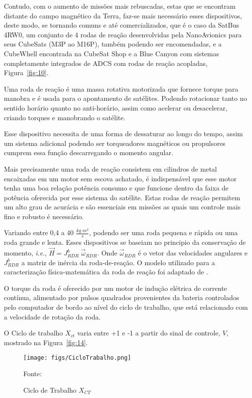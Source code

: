 Contudo, com o aumento de missões mais rebuscadas, estas que se encontram distante do campo magnético da Terra, faz-se mais necessário esses dispositivos, deste modo, se tornando comuns e até comercializados, que é o caso da SatBus 4RW0, um conjunto de 4 rodas de reação desenvolvidas pela NanoAvionics para seus CubeSats (M3P ao M16P),  também podendo ser encomendadas, e a CubeWhell encontrada na CubeSat Shop e a Blue Canyon com sistemas completamente integrados de ADCS com rodas de reação acopladas,  Figura~\ref{fig:10}.


Uma roda de reação é uma massa rotativa motorizada que fornece torque para manobra e é usada para o apontamento de satélites. Podendo rotacionar tanto no sentido horário quanto no anti-horário, assim como acelerar ou desacelerar, criando torques e manobrando o satélite.

Esse dispositivo necessita de uma forma de dessaturar ao longo do tempo, assim um sistema adicional podendo ser torqueadores magnéticos ou propulsores cumprem essa função descarregando o momento angular.

Mais precisamente uma roda de reação consistem em cilindros de metal encaixadas em um motor sem escova achatado, é indispensável que esse motor tenha uma boa relação potência consumo e que funcione dentro da faixa de potência oferecida por esse sistema do satélite. Estas rodas de reação permitem um alto grau de acurácia e são essenciais em missões as quais um controle mais fino e robusto é necessário.

Variando entre 0,4 a 40 $\frac{kg\;m^2}{s}$, podendo ser uma roda pequena e rápida ou uma roda grande e lenta. Esses dispositivos se baseiam no principio da conservação de momento, \textit{i.e.}, $\vec{H}=J^b_{RDR}\;\vec{\omega}_{RDR}$. Onde $\vec{\omega}_{RDR}$ é o vetor das velocidades angulares e $J^b_{RDR}$ a matriz de inércia da roda-de-reação. O modelo utilizado para a caracterização física-matemática da roda de reação foi adaptado de \cite[p.~270-271]{wertz2012spacecraft}.

O torque da roda é oferecido por um motor de indução elétrica de corrente contínua, alimentado por pulsos quadrados provenientes da bateria controlados pelo computador de bordo ao nível do ciclo de trabalho, que está relacionado com a velocidade de rotação da roda.

O Ciclo de trabalho $X_{ct}$ varia entre +1 e -1 a partir do sinal de controle, $V$, mostrado na Figura~\ref{fig:14}.

\begin{figure}[htpb]
\centering
\texttt{[image: figs/CicloTrabalho.png]}
\caption{Ciclo de Trabalho $X_{CT}$}
{Fonte: \cite[p.~271]{wertz2012spacecraft}}
\label{fig:6}
\end{figure}


